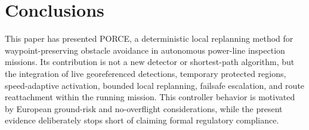 \documentclass[electronics,article,submit,moreauthors]{Definitions/mdpi}
\DeclareRobustCommand{\deleted}[1]{}%
\DeclareRobustCommand{\added}[1]{#1}%
\DeclareRobustCommand{\deleted}[1]{\textcolor{black}{\sout{#1}}}
\DeclareRobustCommand{\added}[1]{\textcolor{green!50!black}{#1}}
\def\deleted#1{}%
\def\added#1{#1}%
\begin{document}
\section{Conclusions}

This paper has presented PORCE, a deterministic local replanning method for waypoint-preserving obstacle avoidance in autonomous power-line inspection missions\deleted{, and has demonstrated it end-to-end inside a georeferenced Unreal Engine/Cesium simulation workflow. The central}\added{. Its} contribution is not \deleted{obstacle avoidance itself, which is a mature field}\added{a new detector or shortest-path algorithm}, but the integration of \deleted{the}\added{live georeferenced detections, temporary protected regions, speed-adaptive activation, bounded local replanning, failsafe escalation, and route reattachment within the running mission. This controller behavior is motivated by} European ground-risk \deleted{logic into the online controller: live detections are converted into protected local regions with hard safety radii, so the vehicle performs a conservative, auditable detour instead of overflying them, and the global inspection Mission resumes automatically once the conflict is resolved.}\added{and no-overflight considerations, while the present evidence deliberately stops short of claiming formal regulatory compliance.}
\end{document}
